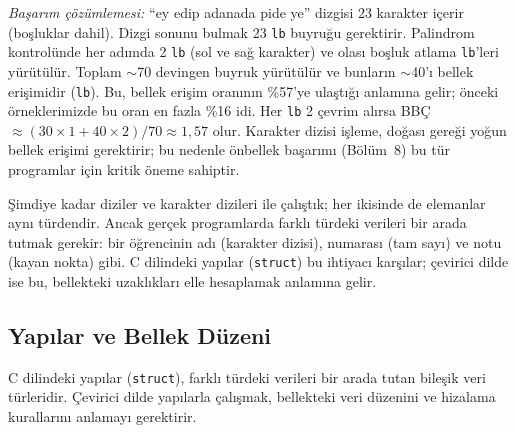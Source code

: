 \begin{ornek}[4.11]
\emph{Başarım çözümlemesi:} ``ey edip adanada pide ye'' dizgisi 23 karakter içerir (boşluklar dahil). Dizgi sonunu bulmak 23 \texttt{lb} buyruğu gerektirir. Palindrom kontrolünde her adımda 2 \texttt{lb} (sol ve sağ karakter) ve olası boşluk atlama \texttt{lb}'leri yürütülür. Toplam $\sim$70 devingen buyruk yürütülür ve bunların $\sim$40'ı bellek erişimidir (\texttt{lb}). Bu, bellek erişim oranının \%57'ye ulaştığı anlamına gelir; önceki örneklerimizde bu oran en fazla \%16 idi. Her \texttt{lb} 2 çevrim alırsa BBÇ~$\approx (30 \times 1 + 40 \times 2) / 70 \approx 1{,}57$ olur. Karakter dizisi işleme, doğası gereği yoğun bellek erişimi gerektirir; bu nedenle önbellek başarımı (Bölüm~8) bu tür programlar için kritik öneme sahiptir.
\end{ornek}


Şimdiye kadar diziler ve karakter dizileri ile çalıştık; her ikisinde de elemanlar aynı türdendir. Ancak gerçek programlarda farklı türdeki verileri bir arada tutmak gerekir: bir öğrencinin adı (karakter dizisi), numarası (tam sayı) ve notu (kayan nokta) gibi. C dilindeki yapılar (\texttt{struct}) bu ihtiyacı karşılar; çevirici dilde ise bu, bellekteki uzaklıkları elle hesaplamak anlamına gelir.

\subsection{Yapılar ve Bellek Düzeni}
\label{subsec:yapilar}

C dilindeki yapılar (\texttt{struct}), farklı türdeki verileri bir arada tutan bileşik veri türleridir. Çevirici dilde yapılarla çalışmak, bellekteki veri düzenini ve hizalama kurallarını anlamayı gerektirir.

